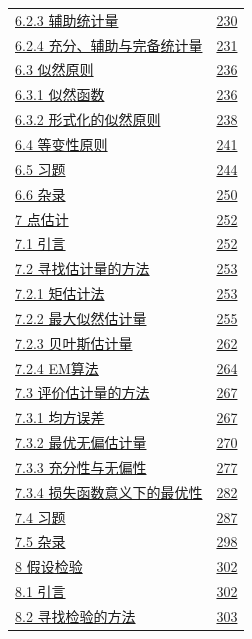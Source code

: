 \begin{longtable}{@{}p{}r@{}}
\hyperref[sec:6.2.3]{6.2.3 辅助统计量} & \hyperref[sec:6.2.3]{230} \\
\hyperref[sec:6.2.4]{6.2.4 充分、辅助与完备统计量} & \hyperref[sec:6.2.4]{231} \\
\hyperref[sec:6.3]{6.3 似然原则} & \hyperref[sec:6.3]{236} \\
\hyperref[sec:6.3.1]{6.3.1 似然函数} & \hyperref[sec:6.3.1]{236} \\
\hyperref[sec:6.3.2]{6.3.2 形式化的似然原则} & \hyperref[sec:6.3.2]{238} \\
\hyperref[sec:6.4]{6.4 等变性原则} & \hyperref[sec:6.4]{241} \\
\hyperref[sec:6.5]{6.5 习题} & \hyperref[sec:6.5]{244} \\
\hyperref[sec:6.6]{6.6 杂录} & \hyperref[sec:6.6]{250} \\
\hyperref[sec:7]{7 点估计} & \hyperref[sec:7]{252} \\
\hyperref[sec:7.1]{7.1 引言} & \hyperref[sec:7.1]{252} \\
\hyperref[sec:7.2]{7.2 寻找估计量的方法} & \hyperref[sec:7.2]{253} \\
\hyperref[sec:7.2.1]{7.2.1 矩估计法} & \hyperref[sec:7.2.1]{253} \\
\hyperref[sec:7.2.2]{7.2.2 最大似然估计量} & \hyperref[sec:7.2.2]{255} \\
\hyperref[sec:7.2.3]{7.2.3 贝叶斯估计量} & \hyperref[sec:7.2.3]{262} \\
\hyperref[sec:7.2.4]{7.2.4 EM算法} & \hyperref[sec:7.2.4]{264} \\
\hyperref[sec:7.3]{7.3 评价估计量的方法} & \hyperref[sec:7.3]{267} \\
\hyperref[sec:7.3.1]{7.3.1 均方误差} & \hyperref[sec:7.3.1]{267} \\
\hyperref[sec:7.3.2]{7.3.2 最优无偏估计量} & \hyperref[sec:7.3.2]{270} \\
\hyperref[sec:7.3.3]{7.3.3 充分性与无偏性} & \hyperref[sec:7.3.3]{277} \\
\hyperref[sec:7.3.4]{7.3.4 损失函数意义下的最优性} & \hyperref[sec:7.3.4]{282} \\
\hyperref[sec:7.4]{7.4 习题} & \hyperref[sec:7.4]{287} \\
\hyperref[sec:7.5]{7.5 杂录} & \hyperref[sec:7.5]{298} \\
\hyperref[sec:8]{8 假设检验} & \hyperref[sec:8]{302} \\
\hyperref[sec:8.1]{8.1 引言} & \hyperref[sec:8.1]{302} \\
\hyperref[sec:8.2]{8.2 寻找检验的方法} & \hyperref[sec:8.2]{303} \\

\end{longtable}

